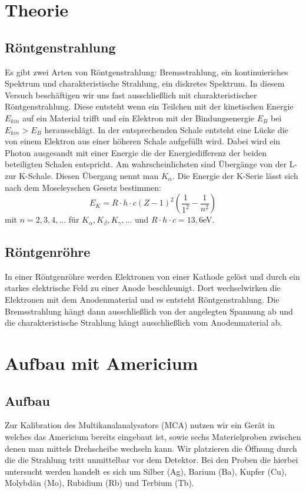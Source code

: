 \documentclass[a4paper,14pt]{article}
\begin{document}
\section{Theorie}
\subsection{Röntgenstrahlung}
Es gibt zwei Arten von Röntgenstrahlung: Bremsstrahlung, ein kontinuieriches Spektrum und charakteristische Strahlung, ein diskretes Spektrum.
In diesem Versuch beschäftigen wir uns fast ausschließlich mit charakteristischer Röntgenstrahlung. Diese entsteht wenn ein Teilchen mit der kinetischen Energie $E_{kin}$ auf ein Material trifft und ein Elektron mit der Bindungsenergie $E_B$ bei $E_{kin} > E_B$ herausschlägt. In der entsprechenden Schale entsteht eine Lücke die von einem Elektron aus einer höheren Schale aufgefüllt wird. Dabei wird ein Photon ausgesandt mit einer Energie die der Energiedifferenz der beiden beteiligten Schalen entspricht. Am wahrscheinlichsten sind Übergänge von der L- zur K-Schale. Diesen Übergang nennt man $K_\alpha$.
Die Energie der K-Serie lässt sich nach dem Moseleyschen Gesetz bestimmen:
\begin{equation}
	E_K = R \cdot h \cdot c (Z-1)^2 (\frac{1}{1^2} - \frac{1}{n^2})
\end{equation}
mit $n = 2,3,4,...$ für $K_\alpha, K_\beta, K_\gamma, ...$ und $R \cdot h \cdot c = 13,6$eV.

\subsection{Röntgenröhre}
In einer Röntgenröhre werden Elektronen von einer Kathode gelöst und durch ein starkes elektrische Feld zu einer Anode beschleunigt. Dort wechselwirken die Elektronen mit dem Anodenmaterial und es entsteht Röntgenstrahlung. Die Bremsstrahlung hängt dann ausschließlich von der angelegten Spannung ab und die charakteristische Strahlung hängt ausschließlich vom Anodenmaterial ab.


\section{Aufbau mit Americium}
\subsection{Aufbau}
Zur Kalibration des Multikanalanalysators (MCA) nutzen wir ein Gerät in welches das Americium bereits eingebaut ist, sowie sechs Materielproben zwischen denen man mittels Drehscheibe wechseln kann. Wir platzieren die Öffnung durch die die Strahlung tritt unmittelbar vor dem Detektor.
Bei den Proben die hierbei untersucht werden handelt es sich um Silber (Ag), Barium (Ba), Kupfer (Cu), Molybdän (Mo), Rubidium (Rb) und Terbium (Tb).
\end{document}
